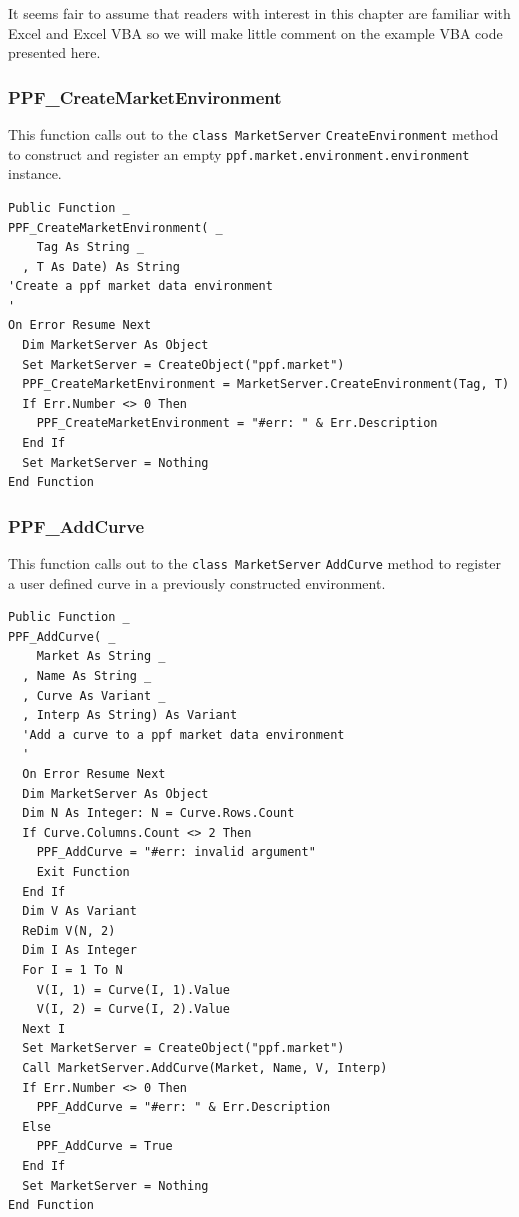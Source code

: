 It seems fair to assume that readers with interest in this chapter are
familiar with Excel and Excel VBA so we will make little comment on the
example VBA code presented here.

\subsubsection{PPF\_CreateMarketEnvironment}

This function calls out to the \verb|class MarketServer|
\verb|CreateEnvironment| method to construct and register an empty
\verb|ppf.market.environment.environment| instance.
\begin{verbatim}
Public Function _
PPF_CreateMarketEnvironment( _
    Tag As String _
  , T As Date) As String
'Create a ppf market data environment
'
On Error Resume Next
  Dim MarketServer As Object
  Set MarketServer = CreateObject("ppf.market")
  PPF_CreateMarketEnvironment = MarketServer.CreateEnvironment(Tag, T)
  If Err.Number <> 0 Then
    PPF_CreateMarketEnvironment = "#err: " & Err.Description
  End If
  Set MarketServer = Nothing
End Function
\end{verbatim}

\subsubsection{PPF\_AddCurve}

This function calls out to the \verb|class MarketServer|
\verb|AddCurve| method to register a user defined curve in a
previously constructed environment.
\begin{verbatim}
Public Function _
PPF_AddCurve( _
    Market As String _
  , Name As String _
  , Curve As Variant _
  , Interp As String) As Variant
  'Add a curve to a ppf market data environment
  '
  On Error Resume Next
  Dim MarketServer As Object
  Dim N As Integer: N = Curve.Rows.Count
  If Curve.Columns.Count <> 2 Then
    PPF_AddCurve = "#err: invalid argument"
    Exit Function
  End If
  Dim V As Variant
  ReDim V(N, 2)
  Dim I As Integer
  For I = 1 To N
    V(I, 1) = Curve(I, 1).Value
    V(I, 2) = Curve(I, 2).Value
  Next I
  Set MarketServer = CreateObject("ppf.market")
  Call MarketServer.AddCurve(Market, Name, V, Interp)
  If Err.Number <> 0 Then
    PPF_AddCurve = "#err: " & Err.Description
  Else
    PPF_AddCurve = True
  End If
  Set MarketServer = Nothing
End Function
\end{verbatim}

